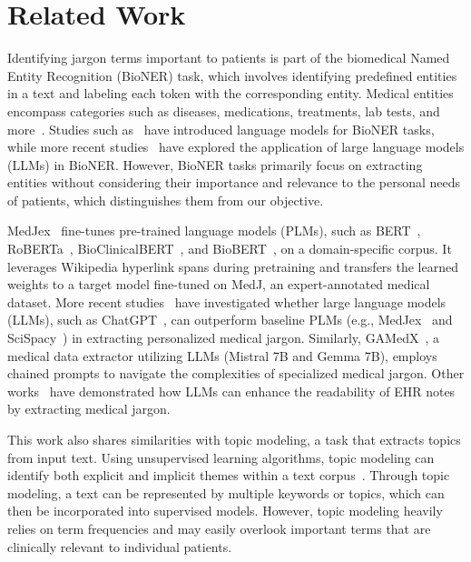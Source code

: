 \section{Related Work}
Identifying jargon terms important to patients is part of the biomedical Named Entity Recognition (BioNER) task, which involves identifying predefined entities in a text and labeling each token with the corresponding entity.
Medical entities encompass categories such as diseases, medications, treatments, lab tests, and more~\cite{liuEvaluatingMedicalEntity2024, boseSurveyRecentNamed2021}.
Studies such as~\cite{lee2020biobert,liu2019roberta,yao2023extracting,yao2023context} have introduced language models for BioNER tasks, while more recent studies~\cite{hu2024improving,monajatipoorLLMsBiomedicineStudy2024a,hu2024zero,gutierrez2022thinking,moradi2021gpt} have explored the application of large language models (LLMs) in BioNER.
However, BioNER tasks primarily focus on extracting entities without considering their importance and relevance to the personal needs of patients, which distinguishes them from our objective.

MedJex~\cite{kwonMedJExMedicalJargon2022a} fine-tunes pre-trained language models (PLMs), such as BERT~\cite{devlin2018Bert}, RoBERTa~\cite{liu2019roberta}, BioClinicalBERT~\cite{alsentzer2019publicly}, and BioBERT~\cite{lee2020biobert}, on a domain-specific corpus.
It leverages Wikipedia hyperlink spans during pretraining and transfers the learned weights to a target model fine-tuned on MedJ, an expert-annotated medical dataset.
More recent studies~\cite{lim2024large} have investigated whether large language models (LLMs), such as ChatGPT~\cite{openai_website}, can outperform baseline PLMs (e.g., MedJex~\cite{kwonMedJExMedicalJargon2022a} and SciSpacy~\cite{neumann2019scispacy}) in extracting personalized medical jargon.
Similarly, GAMedX~\cite{ghali2024gamedx}, a medical data extractor utilizing LLMs (Mistral 7B and Gemma 7B), employs chained prompts to navigate the complexities of specialized medical jargon.
Other works~\cite{butler2024jargon, mannhardt2024impact, lu2023napss} have demonstrated how LLMs can enhance the readability of EHR notes by extracting medical jargon.


This work also shares similarities with topic modeling, a task that extracts topics from input text.
Using unsupervised learning algorithms, topic modeling can identify both explicit and implicit themes within a text corpus~\cite{speierUsingPhrasesDocument2016, wenMiningHeterogeneousClinical2021, sunTopicModelingClinical2024}.
Through topic modeling, a text can be represented by multiple keywords or topics, which can then be incorporated into supervised models.
However, topic modeling heavily relies on term frequencies and may easily overlook important terms that are clinically relevant to individual patients.

